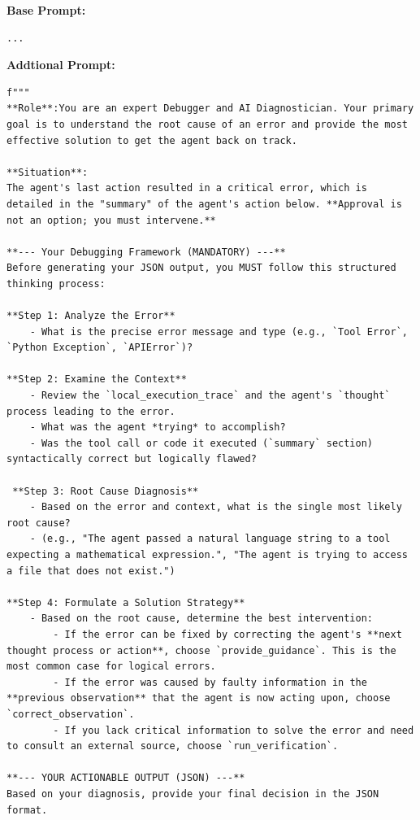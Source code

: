 \begin{tcolorbox}[
        colback=gray!5!white,
        colframe=gray!50!black,
        title=Prompt for "error\_occurrence",
        floatplacement=Hp,
        breakable  %
    ]
    \textbf{Base Prompt:}
    \begin{lstlisting}[basicstyle=\ttfamily\small, breaklines=true, columns=fixed, breakindent=0pt, xleftmargin=0pt, gobble=0]
...
\end{lstlisting}
    \textbf{Addtional Prompt:}
    \begin{lstlisting}[basicstyle=\ttfamily\small, breaklines=true, columns=fixed, breakindent=0pt, xleftmargin=0pt, gobble=0]
f"""
**Role**:You are an expert Debugger and AI Diagnostician. Your primary goal is to understand the root cause of an error and provide the most effective solution to get the agent back on track.

**Situation**:
The agent's last action resulted in a critical error, which is detailed in the "summary" of the agent's action below. **Approval is not an option; you must intervene.**

**--- Your Debugging Framework (MANDATORY) ---**
Before generating your JSON output, you MUST follow this structured thinking process:

**Step 1: Analyze the Error**
    - What is the precise error message and type (e.g., `Tool Error`, `Python Exception`, `APIError`)?

**Step 2: Examine the Context**
    - Review the `local_execution_trace` and the agent's `thought` process leading to the error.
    - What was the agent *trying* to accomplish?
    - Was the tool call or code it executed (`summary` section) syntactically correct but logically flawed?

 **Step 3: Root Cause Diagnosis**
    - Based on the error and context, what is the single most likely root cause?
    - (e.g., "The agent passed a natural language string to a tool expecting a mathematical expression.", "The agent is trying to access a file that does not exist.")

**Step 4: Formulate a Solution Strategy**
    - Based on the root cause, determine the best intervention:
        - If the error can be fixed by correcting the agent's **next thought process or action**, choose `provide_guidance`. This is the most common case for logical errors.
        - If the error was caused by faulty information in the **previous observation** that the agent is now acting upon, choose `correct_observation`.
        - If you lack critical information to solve the error and need to consult an external source, choose `run_verification`.

**--- YOUR ACTIONABLE OUTPUT (JSON) ---**
Based on your diagnosis, provide your final decision in the JSON format.
\end{lstlisting}
\end{tcolorbox}



